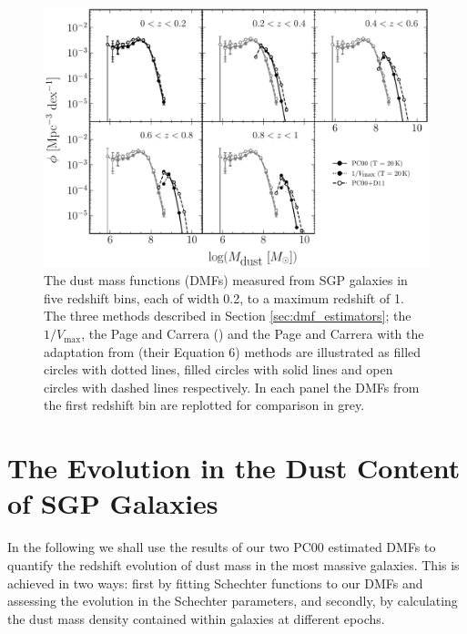 \begin{figure}
	\centering
	\includegraphics[width=0.9\columnwidth]{Figures/dmf_methods.pdf}
	\caption{The dust mass functions (DMFs) measured from SGP galaxies in five redshift bins, each of width 0.2, to a maximum redshift of 1. The three methods described in Section \ref{sec:dmf_estimators}; the $1/V_{\textrm{max}}$, the Page and Carrera (\citealt{Page_2000}) and the Page and Carrera with the adaptation from \citealt{Dunne_2011} (their Equation 6) methods are illustrated as filled circles with dotted lines, filled circles with solid lines and open circles with dashed lines respectively. In each panel the DMFs from the first redshift bin are replotted for comparison in grey.}
	\label{fig:dmf_methods}
\end{figure}


\section{The Evolution in the Dust Content of SGP Galaxies}

In the following we shall use the results of our two PC00 estimated DMFs to quantify the redshift evolution of dust mass in the most massive galaxies. This is achieved in two ways: first by fitting Schechter functions to our DMFs and assessing the evolution in the Schechter parameters, and secondly, by calculating the dust mass density contained within galaxies at different epochs.

